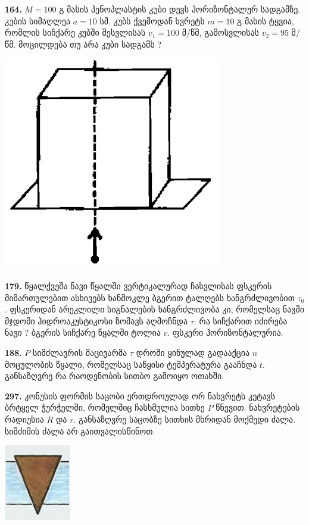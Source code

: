 \documentclass[12pt,a4paper,]{report}
\begin{document}
\textbf{164.} $M=100$ გ მასის პენოპლასტის კუბი დევს ჰორიზონტალურ სადგამზე. კუბის სიმაღლეა $a=10$ სმ. კუბს ქვემოდან ხვრეტს $m=10$ გ მასის ტყვია, რომლის სიჩქარე კუბში შესვლისას $v_1=100$ მ/წმ, გამოსვლისას $v_2=95$ მ/წმ. მოცილდება თუ არა კუბი სადგამს ? 
		\begin{center}
			\includegraphics[scale=0.4]{images/164.png}
		\end{center}
	
\textbf{179.} წყალქვეშა ნავი წყალში ვერტიკალურად ჩასვლისას ფსკერის მიმართულებით ასხივებს ხანმოკლე ბგერით ტალღებს ხანგრძლივობით $\tau_0$. ფსკერიდან არეკლილი სიგნალების ხანგრძლივობა კი, რომელსაც ნავში მჯდომი ჰიდროაკუსტიკოსი ზომავს აღმოჩნდა $\tau$. რა სიჩქარით იძირება ნავი ? ბგერის სიჩქარე წყალში ტოლია $v$. ფსკერი ჰორიზონტალურია.

\textbf{188.} $P$ სიმძლავრის მაცივარმა $\tau$ დროში ყინულად გადააქცია $n$ მოცულობის წყალი, რომელსაც საწყისი ტემპერატურა გააჩნდა $t$. განსაზღვრე რა რაოდენობის სითბო გამოიყო ოთახში.
 
\textbf{297.} კონუსის ფორმის საცობი ერთდროულად ორ ნახვრეტს კეტავს ბრტყელ ჭურჭელში, რომელშიც ჩასხმულია სითხე $P$ წნევით.  ნახვრეტების რადიუსია $R$ და $r$. განსაზღვრე საცობზე სითხის მხრიდან მოქმედი ძალა. სიმძიმის ძალა არ გაითვალისწინოთ.
		\begin{center}
			\includegraphics[scale=0.5]{images/F297.jpg}
		\end{center}
\end{document}

